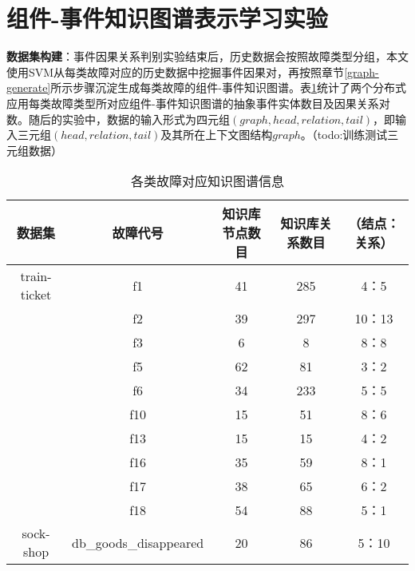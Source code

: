 \section{组件-事件知识图谱表示学习实验}
\textbf{数据集构建}：事件因果关系判别实验结束后，历史数据会按照故障类型分组，本文使用SVM从每类故障对应的历史数据中挖掘事件因果对，再按照章节\ref{graph-generate}所示步骤沉淀生成每类故障的组件-事件知识图谱。表\ref{kg-abstract-event-num}统计了两个分布式应用每类故障类型所对应组件-事件知识图谱的抽象事件实体数目及因果关系对数。随后的实验中，数据的输入形式为四元组$(graph,head,relation,tail)$，即输入三元组$(head,relation,tail)$及其所在上下文图结构$graph$。（todo:训练测试三元组数据）
\begin{table}[htbp]
    \caption{各类故障对应知识图谱信息}
    \label{kg-abstract-event-num}
    \begin{tabular}{ccccc}
    \hline
    数据集          & 故障代号                                                      & 知识库节点数目 & 知识库关系数目 & （结点：关系） \\ \hline
    train-ticket & f1                                                        & 41      & 285     & 4：5     \\
                 & f2                                                        & 39      & 297     & 10：13   \\
                 & f3                                                        & 6       & 8       & 8：8     \\
                 & f5                                                        & 62      & 81      & 3：2     \\
                 & f6                                                        & 34      & 233     & 5：5     \\
                 & f10                                                       & 15      & 51      & 8：6     \\
                 & f13                                                       & 15      & 15      & 4：2     \\
                 & f16                                                       & 35      & 59      & 8：1     \\
                 & f17                                                       & 38      & 65      & 6：2     \\
                 & f18                                                       & 54      & 88      & 5：1     \\ \hline
    sock-shop    & db\_goods\_disappeared           & 20      & 86      & 5：10    \\

\end{tabular}
\end{table}
